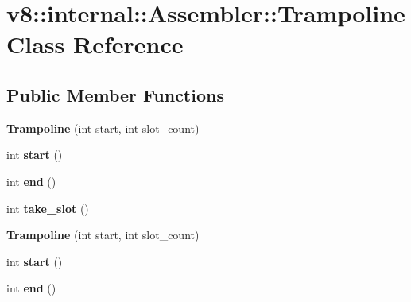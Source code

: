 \hypertarget{classv8_1_1internal_1_1_assembler_1_1_trampoline}{}\section{v8\+:\+:internal\+:\+:Assembler\+:\+:Trampoline Class Reference}
\label{classv8_1_1internal_1_1_assembler_1_1_trampoline}
\subsection*{Public Member Functions}
\begin{DoxyCompactItemize}
\item 
{\bfseries Trampoline} (int start, int slot\+\_\+count)\hypertarget{classv8_1_1internal_1_1_assembler_1_1_trampoline_a842cc1ad9d3a29292e7741da5fa35c87}{}\label{classv8_1_1internal_1_1_assembler_1_1_trampoline_a842cc1ad9d3a29292e7741da5fa35c87}

\item 
int {\bfseries start} ()\hypertarget{classv8_1_1internal_1_1_assembler_1_1_trampoline_a00b9e32adaca8657d67942d3309cda72}{}\label{classv8_1_1internal_1_1_assembler_1_1_trampoline_a00b9e32adaca8657d67942d3309cda72}

\item 
int {\bfseries end} ()\hypertarget{classv8_1_1internal_1_1_assembler_1_1_trampoline_a301caa331809903a624dbb4dad0885f4}{}\label{classv8_1_1internal_1_1_assembler_1_1_trampoline_a301caa331809903a624dbb4dad0885f4}

\item 
int {\bfseries take\+\_\+slot} ()\hypertarget{classv8_1_1internal_1_1_assembler_1_1_trampoline_aadea2897c5eed8217284362ee9a25420}{}\label{classv8_1_1internal_1_1_assembler_1_1_trampoline_aadea2897c5eed8217284362ee9a25420}

\item 
{\bfseries Trampoline} (int start, int slot\+\_\+count)\hypertarget{classv8_1_1internal_1_1_assembler_1_1_trampoline_a842cc1ad9d3a29292e7741da5fa35c87}{}\label{classv8_1_1internal_1_1_assembler_1_1_trampoline_a842cc1ad9d3a29292e7741da5fa35c87}

\item 
int {\bfseries start} ()\hypertarget{classv8_1_1internal_1_1_assembler_1_1_trampoline_a00b9e32adaca8657d67942d3309cda72}{}\label{classv8_1_1internal_1_1_assembler_1_1_trampoline_a00b9e32adaca8657d67942d3309cda72}

\item 
int {\bfseries end} ()\hypertarget{classv8_1_1internal_1_1_assembler_1_1_trampoline_a301caa331809903a624dbb4dad0885f4}{}\label{classv8_1_1internal_1_1_assembler_1_1_trampoline_a301caa331809903a624dbb4dad0885f4}


\end{DoxyCompactItemize}
